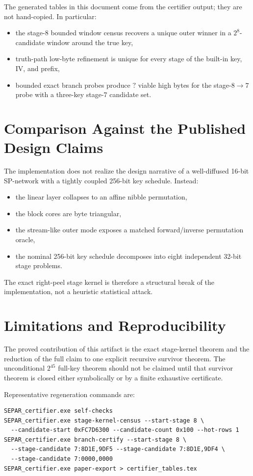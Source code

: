 \documentclass[11pt]{article}
\providecommand{\FullTargetBound}{2^{45}}
\providecommand{\BoundedBranchViableHighCount}{?}
\begin{document}
The generated tables in this document come from the certifier output; they are not hand-copied. In particular:
\begin{itemize}
\item the stage-\(8\) bounded window census recovers a unique outer winner in a \(2^8\)-candidate window around the true key,
\item truth-path low-byte refinement is unique for every stage of the built-in key, IV, and prefix,
\item bounded exact branch probes produce \(\BoundedBranchViableHighCount\) viable high bytes for the stage-\(8\to7\) probe with a three-key stage-\(7\) candidate set.
\end{itemize}


\section{Comparison Against the Published Design Claims}
The implementation does not realize the design narrative of a well-diffused 16-bit SP-network with a tightly coupled 256-bit key schedule. Instead:
\begin{itemize}
\item the linear layer collapses to an affine nibble permutation,
\item the block cores are byte triangular,
\item the stream-like outer mode exposes a matched forward/inverse permutation oracle,
\item the nominal 256-bit key schedule decomposes into eight independent 32-bit stage problems.
\end{itemize}

The exact right-peel stage kernel is therefore a structural break of the implementation, not a heuristic statistical attack.

\section{Limitations and Reproducibility}
The proved contribution of this artifact is the exact stage-kernel theorem and the reduction of the full claim to one explicit recursive survivor theorem. The unconditional \(\FullTargetBound\) full-key theorem should not be claimed until that survivor theorem is closed either symbolically or by a finite exhaustive certificate.

Representative regeneration commands are:
\begin{verbatim}
SEPAR_certifier.exe self-checks
SEPAR_certifier.exe stage-kernel-census --start-stage 8 \
  --candidate-start 0xFC7D6300 --candidate-count 0x100 --hot-rows 1
SEPAR_certifier.exe branch-certify --start-stage 8 \
  --stage-candidate 7:8D1E,9DF5 --stage-candidate 7:8D1E,9DF4 \
  --stage-candidate 7:0000,0000
SEPAR_certifier.exe paper-export > certifier_tables.tex
\end{verbatim}
\end{document}
